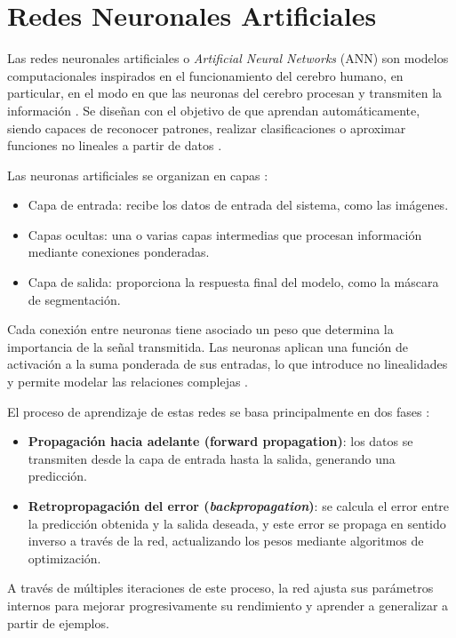 \section{Redes Neuronales Artificiales}
Las redes neuronales artificiales o \textit{Artificial Neural Networks} (ANN) son modelos computacionales inspirados en el funcionamiento del cerebro humano, en particular, en el modo en que las neuronas del cerebro procesan y transmiten la información \cite{ann2004}. Se diseñan con el objetivo de que aprendan automáticamente, siendo capaces de reconocer patrones, realizar clasificaciones o aproximar funciones no lineales a partir de datos \cite{deeplearning2016}.

Las neuronas artificiales se organizan en capas \cite{ann2004}:
\begin{itemize}
    \item Capa de entrada: recibe los datos de entrada del sistema, como las imágenes.
    \item Capas ocultas: una o varias capas intermedias que procesan información mediante conexiones ponderadas.
    \item Capa de salida: proporciona la respuesta final del modelo, como la máscara de segmentación.
\end{itemize}
Cada conexión entre neuronas tiene asociado un peso que determina la importancia de la señal transmitida. Las neuronas aplican una función de activación a la suma ponderada de sus entradas, lo que introduce no linealidades y permite modelar las relaciones complejas \cite{deeplearning2016}.

El proceso de aprendizaje de estas redes se basa principalmente en dos fases \cite{deeplearning2016}:
\begin{itemize}
    \item \textbf{Propagación hacia adelante (forward propagation)}: los datos se transmiten desde la capa de entrada hasta la salida, generando una predicción.
    \item \textbf{Retropropagación del error (\textit{backpropagation})}: se calcula el error entre la predicción obtenida y la salida deseada, y este error se propaga en sentido inverso a través de la red, actualizando los pesos mediante algoritmos de optimización.
\end{itemize}

A través de múltiples iteraciones de este proceso, la red ajusta sus parámetros internos para mejorar progresivamente su rendimiento y aprender a generalizar a partir de ejemplos.

